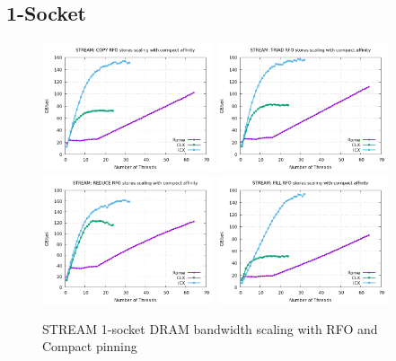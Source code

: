 \documentclass{article}
\begin{document}
\subsection{1-Socket}
\begin{figure}[!ht]
    \centering
    \includegraphics[width=0.45\textwidth]{../mem_bw_scale/mb_scale_compact_Copy_rfo}
    \includegraphics[width=0.45\textwidth]{../mem_bw_scale/mb_scale_compact_Triad_rfo}
    \includegraphics[width=0.45\textwidth]{../mem_bw_scale/mb_scale_compact_Reduce_rfo}
    \includegraphics[width=0.45\textwidth]{../mem_bw_scale/mb_scale_compact_Fill_rfo}
    \caption{STREAM 1-socket DRAM bandwidth scaling with RFO and Compact pinning}
    \label{figure:mem_bw_scale_compact_rfo}
\end{figure}
\end{document}
